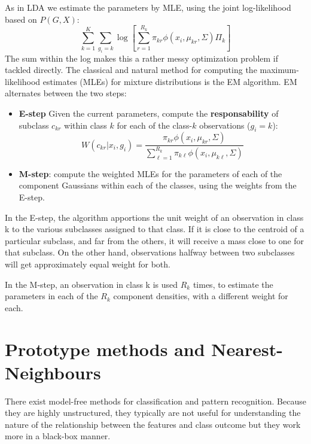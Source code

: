 \documentclass[12pt, letterpaper]{article}
\theoremstyle{definition}
\begin{document}
As in LDA we estimate the parameters by MLE, using the joint log-likelihood based on $P(G,X)$:
\begin{equation}
\sum_{k=1}^K\sum_{g_i=k} \log \left[ \sum_{r=1}^{R_k} \pi_{k r} \phi (x_i,\mu_{k r}, \Sigma)\Pi_k\right]
\end{equation}
The sum within the log makes this a rather messy optimization problem if tackled directly. The classical and natural method for computing the maximum-likelihood estimates (MLEs) for mixture distributions is the EM algorithm. EM alternates between the two steps:
\begin{itemize}
\item \textbf{E-step} Given the current parameters, compute the \textbf{responsability} of subclass $c_{kr}$ within class $k$ for each of the class-$k$ observations ($g_i=k$):
\begin{equation}
W(c_{kr}|x_i, g_i) = \frac{ \pi_{kr}\phi(x_i, \mu_{kr},\Sigma)}{\sum_{\ell=1}^{R_k} \pi_{k \ell}\phi(x_i, \mu_{k \ell},\Sigma)}
\end{equation}
\item \textbf{M-step}: compute the weighted MLEs for the parameters of each of the component Gaussians within each of the classes, using the weights from the E-step.
\end{itemize}

In the E-step, the algorithm apportions the unit weight of an observation in class k to the various subclasses assigned to that class. If it is close to the centroid of a particular subclass, and far from the others, it will receive a mass close to one for that subclass. On the other hand, observations halfway between two subclasses will get approximately equal weight for both.

In the M-step, an observation in class k is used $R_k$ times, to estimate the parameters in each of the $R_k$ component densities, with a different weight for each. 

\newpage
\section{Prototype methods and Nearest-Neighbours}
There exist model-free methods for classification and pattern recognition. Because they are highly unstructured, they typically are not useful for understanding the nature of the relationship between the features and class outcome but they work more in a black-box manner.
\end{document}
